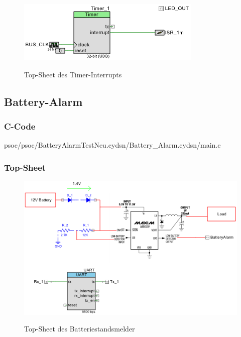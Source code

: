 \documentclass[12pt,a4paper,german]{article}
\begin{document}
 \begin{figure}[H]
	\centering
	\includegraphics[width=\textwidth]{pictures/topsch_timer_int.png}
	\label{fig:topsch_timer_int}
	\caption{Top-Sheet des Timer-Interrupts}
\end{figure}

	
\subsection{Battery-Alarm}

\subsubsection{C-Code}


	{psoc/psoc/BatteryAlarmTestNeu.cydsn/Battery_Alarm.cydsn/main.c}

\subsubsection{Top-Sheet}
	 
 \begin{figure}[H]
	\centering
	\includegraphics[width=\textwidth]{pictures/topsch_battery.png}
	\label{fig:topsch_batter}
	\caption{Top-Sheet des Batteriestandsmelder}
\end{figure}
\end{document}
